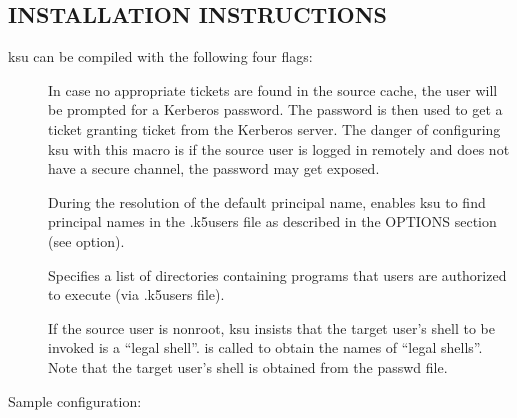 \documentclass[letterpaper,10pt,english]{sphinxmanual}
\begin{document}
\subsection{INSTALLATION INSTRUCTIONS}
\label{\detokenize{user/user_commands/ksu:installation-instructions}}
\sphinxAtStartPar
ksu can be compiled with the following four flags:
\begin{description}
\item[{}] \leavevmode
\sphinxAtStartPar
In case no appropriate tickets are found in the source cache, the
user will be prompted for a Kerberos password.  The password is
then used to get a ticket granting ticket from the Kerberos
server.  The danger of configuring ksu with this macro is if the
source user is logged in remotely and does not have a secure
channel, the password may get exposed.

\item[{}] \leavevmode
\sphinxAtStartPar
During the resolution of the default principal name,
 enables ksu to find principal names in
the .k5users file as described in the OPTIONS section
(see  option).

\item[{}] \leavevmode
\sphinxAtStartPar
Specifies a list of directories containing programs that users are
authorized to execute (via .k5users file).

\item[{}] \leavevmode
\sphinxAtStartPar
If the source user is non\sphinxhyphen{}root, ksu insists that the target user’s
shell to be invoked is a “legal shell”.   is
called to obtain the names of “legal shells”.  Note that the
target user’s shell is obtained from the passwd file.

\end{description}

\sphinxAtStartPar
Sample configuration:

\begin{sphinxVerbatim}[commandchars=\\\{\}]
    
\end{sphinxVerbatim}
\end{document}
